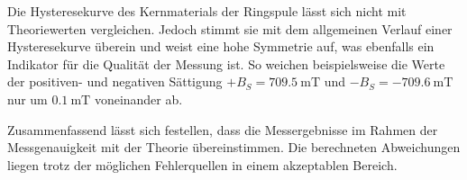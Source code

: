 Die Hysteresekurve des Kernmaterials der Ringspule lässt sich nicht mit Theoriewerten vergleichen. Jedoch stimmt sie mit dem allgemeinen Verlauf einer Hysteresekurve
überein und weist eine hohe Symmetrie auf, was ebenfalls ein Indikator für die Qualität der Messung ist. So weichen beispielsweise die Werte der positiven- und negativen 
Sättigung $+B_S = 709.5 \: \unit{\milli\tesla}$ und $-B_S = -709.6 \: \unit{\milli\tesla}$ nur um $0.1\: \unit{\milli\tesla}$ voneinander ab. 


Zusammenfassend lässt sich festellen, dass die Messergebnisse im Rahmen der Messgenauigkeit mit der Theorie übereinstimmen. Die berechneten
Abweichungen liegen trotz der möglichen Fehlerquellen in einem akzeptablen Bereich. 
